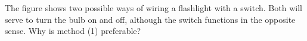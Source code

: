         The figure shows two possible ways of wiring a flashlight
        with a switch. Both will serve to turn the bulb on and off,
        although the switch functions in the opposite sense.  Why is
        method (1) preferable?
